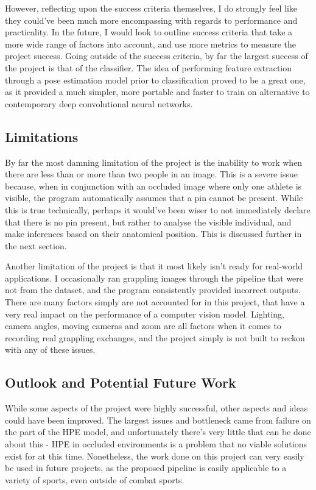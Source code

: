 \documentclass[a4paper, oneside, 11pt]{article}
\begin{document}
\bigskip
\noindent
However, reflecting upon the success criteria themselves, I do strongly feel like they could've been much more encompassing with regards to performance and practicality. In the future, I would look to outline success criteria that take a more wide range of factors into account, and use more metrics to measure the project success. Going outside of the success criteria, by far the largest success of the project is that of the classifier. The idea of performing feature extraction through a pose estimation model prior to classification proved to be a great one, as it provided a much simpler, more portable and faster to train on alternative to contemporary deep convolutional neural networks. 

\subsection{Limitations}

By far the most damning limitation of the project is the inability to work when there are less than or more than two people in an image. This is a severe issue because, when in conjunction with an occluded image where only one athlete is visible, the program automatically assumes that a pin cannot be present. While this is true technically, perhaps it would've been wiser to not immediately declare that there is no pin present, but rather to analyse the visible individual, and make inferences based on their anatomical position. This is discussed further in the next section. 

\bigskip
\noindent
Another limitation of the project is that it most likely isn't ready for real-world applications. I occasionally ran grappling images through the pipeline that were not from the dataset, and the program consistently provided incorrect outputs. There are many factors simply are not accounted for in this project, that have a very real impact on the performance of a computer vision model. Lighting, camera angles, moving cameras and zoom are all factors when it comes to recording real grappling exchanges, and the project simply is not built to reckon with any of these issues.

\subsection{Outlook and Potential Future Work}

While some aspects of the project were highly successful, other aspects and ideas could have been improved. The largest issues and bottleneck came from failure on the part of the HPE model, and unfortunately there's very little that can be done about this - HPE in occluded environments is a problem that no viable solutions exist for at this time. Nonetheless, the work done on this project can very easily be used in future projects, as the proposed pipeline is easily applicable to a variety of sports, even outside of combat sports. 
\end{document}
